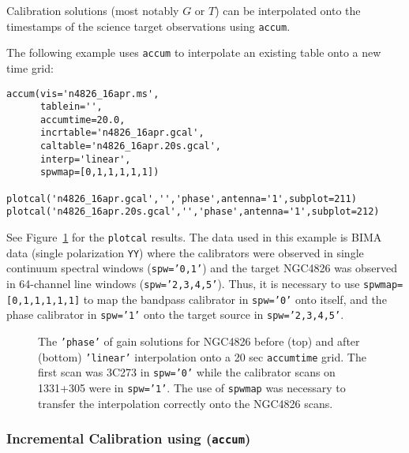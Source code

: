 Calibration solutions (most notably $G$ or $T$) can be interpolated
onto the timestamps of the science target observations using {\tt accum}.  

The following example uses {\tt accum} to interpolate an existing
table onto a new time grid:
\small
\begin{verbatim}
accum(vis='n4826_16apr.ms',
      tablein='',
      accumtime=20.0,
      incrtable='n4826_16apr.gcal',
      caltable='n4826_16apr.20s.gcal',
      interp='linear',
      spwmap=[0,1,1,1,1,1])

plotcal('n4826_16apr.gcal','','phase',antenna='1',subplot=211)
plotcal('n4826_16apr.20s.gcal','','phase',antenna='1',subplot=212)
\end{verbatim}
\normalsize
See Figure~\ref{fig:accum_interp} for the {\tt plotcal} results.
The data used in this example is BIMA data (single polarization 
{\tt  YY}) where the calibrators were observed in single continuum
spectral windows ({\tt spw='0,1'}) and the target NGC4826 was observed
in 64-channel line windows ({\tt spw='2,3,4,5'}).  Thus, it is 
necessary to use {\tt spwmap=[0,1,1,1,1,1]} to map the bandpass
calibrator in {\tt spw='0'} onto itself, and the phase calibrator 
in {\tt spw='1'} onto the target source in {\tt spw='2,3,4,5'}.

\begin{figure}[h!]
\begin{center}
\caption{\label{fig:accum_interp} The {\tt 'phase'} of gain solutions
for NGC4826 before (top) and after (bottom) {\tt 'linear'} interpolation onto
a 20 sec {\tt accumtime} grid.  The first scan was 3C273 in {\tt spw='0'} 
while the calibrator scans on 1331+305 were in {\tt spw='1'}.  The use of 
{\tt spwmap} was necessary to transfer the interpolation correctly
onto the NGC4826 scans.
}
\hrulefill
\end{center}
\end{figure}



\subsubsection{Incremental Calibration using ({\tt accum})}
\label{section:cal.tables.accum.incr}

